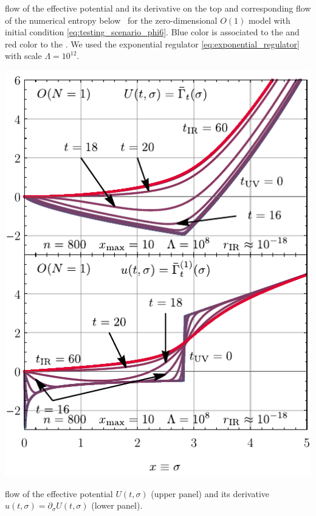 	{%
		\caption{
			\frg{} flow of the effective potential and its derivative on the top  and corresponding flow of the numerical entropy below~ for the zero-dimensional $O(1)$ model with initial condition \eqref{eq:testing_scenario_phi6}.
			{Blue} color is associated to the \uv{} and {red} color to the \ir{}.
			We used the exponential regulator \cref{eq:exponential_regulator} with \uv{} scale $\Lambda = 10^{12}$.
		}\label{fig:sc_iii_on=1_n=800_xmax=10_lambda=1.0e12_tir=60}
	}%
	{\fullWidthTwoColumnFigureSpacing}%
	{%
		\includegraphics[width=\subcaptionFigureWidth]{0d/figures/sc_iv_on=1_n=800_xmax=10_lambda=1.0e8_tir=60_rg_flow.pdf}
		\caption{\frg{} flow of the effective potential $U ( t , \sigma )$ (upper panel) and its derivative $u ( t , \sigma ) = \partial_\sigma U ( t , \sigma )$ (lower panel).}
		\label{fig:sc_iv_on=1_n=800_xmax=10_lambda=1.0e8_tir=60_rg_flow}%
	}%

